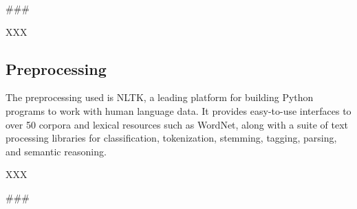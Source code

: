 \documentclass[11pt]{article}
\begin{document}
###

XXX

\subsection{Preprocessing}\label{subsec:preprocessing}
The preprocessing used is NLTK, a leading platform for building Python programs to work with human language data.
It provides easy-to-use interfaces to over 50 corpora and lexical resources such as WordNet,
along with a suite of text processing libraries for classification, tokenization, stemming, tagging, parsing,
and semantic reasoning.

XXX

###
\end{document}
